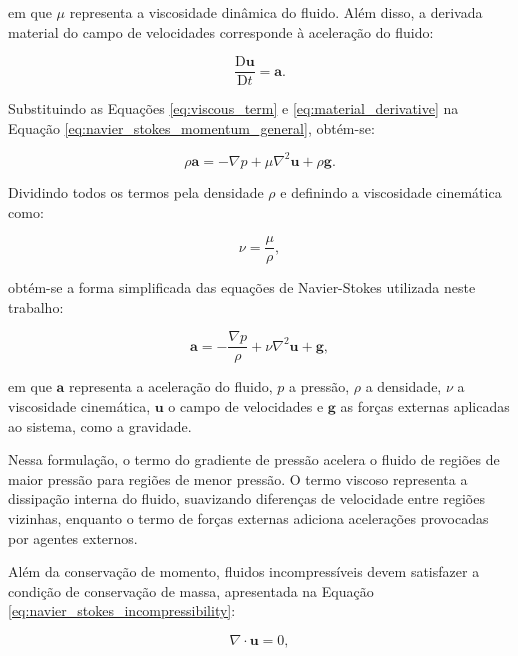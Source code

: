 em que \(\mu\) representa a viscosidade dinâmica do fluido. Além disso, a
derivada material do campo de velocidades corresponde à aceleração do fluido:

\begin{equation}
\frac{\mathrm{D}\mathbf{u}}{\mathrm{D}t}
=
\mathbf{a}.
\label{eq:material_derivative}
\end{equation}

Substituindo as Equações \ref{eq:viscous_term} e \ref{eq:material_derivative}
na Equação \ref{eq:navier_stokes_momentum_general}, obtém-se:

\begin{equation}
\rho \mathbf{a}
=
-\nabla p
+
\mu \nabla^2 \mathbf{u}
+
\rho \mathbf{g}.
\label{eq:navier_stokes_intermediate}
\end{equation}

Dividindo todos os termos pela densidade \(\rho\) e definindo a viscosidade
cinemática como:

\begin{equation}
\nu = \frac{\mu}{\rho},
\label{eq:kinematic_viscosity}
\end{equation}

obtém-se a forma simplificada das equações de Navier-Stokes utilizada neste
trabalho:

\begin{equation}
\mathbf{a}
=
-\frac{\nabla p}{\rho}
+
\nu \nabla^2 \mathbf{u}
+
\mathbf{g},
\label{eq:navier_stokes_momentum}
\end{equation}

em que \(\mathbf{a}\) representa a aceleração do fluido, \(p\) a pressão,
\(\rho\) a densidade, \(\nu\) a viscosidade cinemática, \(\mathbf{u}\) o campo
de velocidades e \(\mathbf{g}\) as forças externas aplicadas ao sistema, como a
gravidade.

Nessa formulação, o termo do gradiente de pressão acelera o fluido de regiões
de maior pressão para regiões de menor pressão. O termo viscoso representa a
dissipação interna do fluido, suavizando diferenças de velocidade entre regiões
vizinhas, enquanto o termo de forças externas adiciona acelerações provocadas
por agentes externos.

Além da conservação de momento, fluidos incompressíveis devem satisfazer a
condição de conservação de massa, apresentada na Equação
\ref{eq:navier_stokes_incompressibility}:

\begin{equation}
\nabla \cdot \mathbf{u} = 0,
\label{eq:navier_stokes_incompressibility}
\end{equation}

